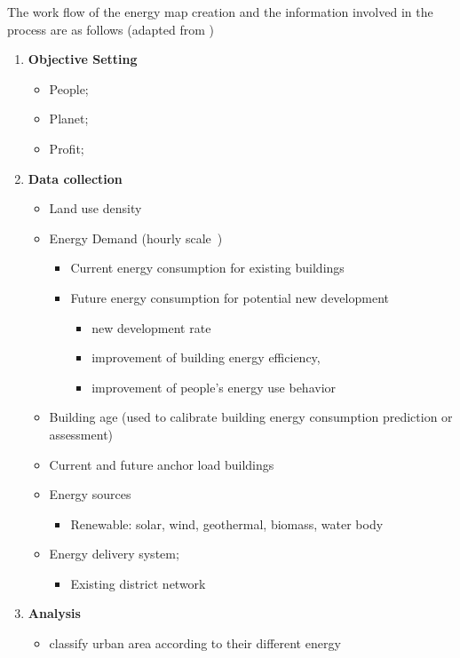 \documentclass[hidelinks,12pt]{article}
\begin{document}
The work flow of the energy map creation and the information involved
in the process are as follows (adapted from \cite{IDEA2012})
\begin{enumerate}[{Step }1]
\item \textbf{Objective Setting}
  \begin{itemize}
  \item People;
  \item Planet;
  \item Profit;
  \end{itemize}
\item \textbf{Data collection}
  \begin{itemize}
  \item Land use density
  \item Energy Demand (hourly scale~\cite{Baird2014})
    \begin{itemize}
    \item Current energy consumption for existing buildings
    \item Future energy consumption for potential new development
      \begin{itemize}
        \item new development rate
        \item improvement of building energy efficiency,
        \item improvement of people's energy use behavior
        \end{itemize}
      \end{itemize}
    \item Building age (used to calibrate building energy consumption
      prediction or assessment)
    \item Current and future anchor load buildings
    \item Energy sources
      \begin{itemize}
      \item Renewable: solar, wind, geothermal, biomass, water body
      \end{itemize}
    \item Energy delivery system;
      \begin{itemize}
      \item Existing district network
      \end{itemize}
    \end{itemize}
  \item \textbf{Analysis}\label{step:analysis}
    \begin{itemize}
    \item classify urban area according to their different energy

\end{itemize}
\end{enumerate}
\end{document}
